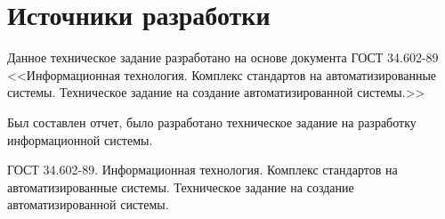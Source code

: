 \documentclass[14pt]{extreport}
\begin{document}
\chapter{Источники разработки}
    Данное техническое задание разработано на основе документа ГОСТ 34.602-89 <<Информационная технология. Комплекс стандартов на автоматизированные системы. Техническое задание на создание автоматизированной системы.>>

\conclusions
    Был составлен отчет, было разработано техническое задание на разработку информационной системы.


\newpage
\begin{thebibliography}{99}
	 	\label{bib:bib1} ГОСТ 34.602-89. Информационная технология. Комплекс стандартов на автоматизированные системы. Техническое задание на создание автоматизированной системы.
\end{thebibliography}
\end{document}
